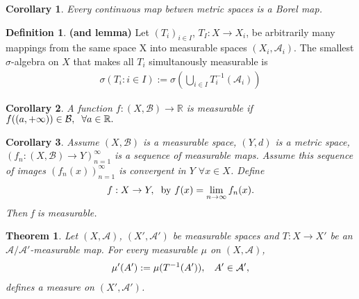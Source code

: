 \documentclass{article}
\newtheorem{theorem}{Theorem}[section]
\newtheorem{corollary}{Corollary}[theorem]
\theoremstyle{definition}
\newtheorem{definition}{Definition}[theorem]
\begin{document}
    \begin{corollary}
        Every continuous map betwen metric spaces is a Borel map.
    \end{corollary}

    \begin{definition}
        \textbf{(and lemma)}
        Let $(T_i)_{i\in I}$, $T_I:X\rightarrow X_i$, be arbitrarily many mappings from the same space X into measurable spaces $(X_i,\mathcal A_i).$ The smallest $\sigma$-algebra on $X$ that makes all $T_i$ simultanously measurable is 
        \begin{align}
            \sigma(T_i:i\in I) := \sigma \left( \bigcup_{i\in I}T_i^{-1}(\mathcal A_i)\right)
        \end{align}

    \end{definition}
	
    \begin{corollary}
        A function $f:(X,\mathcal B)\rightarrow \mathbb R$ is measurable if $f((a,+\infty))\in \mathcal B,\hspace{2mm}\forall a\in \mathbb R.$
    \end{corollary}

    \begin{corollary}
        Assume $(X,\mathcal B)$ is a measurable space, $(Y,d)$ is a metric space, $(f_n:(X,\mathcal B)\rightarrow Y)_{n=1}^\infty$ is a sequence of measurable maps.
        Assume this sequence of images $(f_n(x))_{n=1}^\infty$ is convergent in $Y$ $\forall x\in X$.
        Define \begin{align}
            f:X\rightarrow Y,\hspace{2mm}\text{by  } f(x)=\lim_{n\rightarrow \infty} f_n(x).
        \end{align}
        Then f is measurable.
    \end{corollary}

    \begin{theorem}
        Let $(X,\mathcal A)$, $(X',\mathcal A')$ be measurable spaces and $T:X\rightarrow X'$ be an $\mathcal A/\mathcal A'$-measurable map. For every measurable $\mu$ on $(X,\mathcal A)$, 
        \begin{align}
            \mu'(A') := \mu (T^{-1}(A')),\hspace{3mm} A'\in \mathcal A',
        \end{align}
        defines a measure on $(X',\mathcal A')$.
    \end{theorem}
\end{document}
